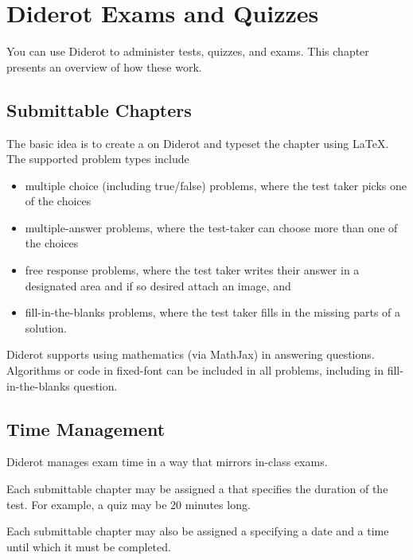 \chapter{Diderot Exams and Quizzes}
\label{ch:quiz}
 
\begin{preamble}
You can use Diderot to administer tests, quizzes, and exams.  This
chapter presents an overview of how these work.
\end{preamble}


\section{Submittable Chapters}
\label{ch:quiz::submittable-chapters}

The basic idea is to create a  on Diderot and typeset the chapter using LaTeX.  The supported problem types include
\begin{itemize}
\item multiple choice (including true/false) problems, where the test taker picks one of the
  choices
\item multiple-answer problems, where the test-taker can choose more than one of the choices
\item free response problems, where the test taker writes their answer in a designated area and if so desired attach an image, and
\item fill-in-the-blanks problems, where the test taker fills in the missing parts of a solution.
\end{itemize}

Diderot supports using mathematics (via MathJax) in answering questions.  
%
Algorithms or code in fixed-font can be included in all problems, including in fill-in-the-blanks question.

\section{Time Management}
\label{ch:quiz::time-management}

Diderot manages exam time in a way that mirrors in-class exams.

\begin{gram}
Each submittable chapter may be assigned a  that
specifies the duration of the test.  For example, a quiz may be 20
minutes long.

Each submittable chapter may also be assigned a  specifying a date and a time until which it must be completed. 
\end{gram}

